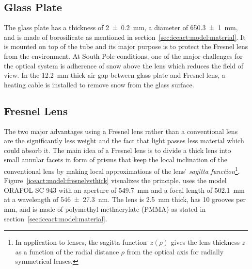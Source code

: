 \subsection{Glass Plate}\label{iceact:model:glassplate}

The \iceact glass plate has a thickness of \SI{2+-0.2}{\milli\meter}, a diameter of \SI{650.3+-1}{\milli\meter}, and is made of borosilicate as mentioned in section~\ref{sec:iceact:model:material}. It is mounted on top of the tube and its major purpose is to protect the Fresnel lens from the environment. At South Pole conditions, one of the major challenges for the optical system is adherence of snow above the lens which reduces the field of view. In the \SI{12.2}{\milli\meter} thick air gap between glass plate and Fresnel lens, a heating cable is installed to remove snow from the glass surface. 

\subsection{Fresnel Lens}\label{iceact:model:fresnellens}

The two major advantages using a Fresnel lens rather than a conventional lens are the significantly less weight and the fact that light passes less material which could absorb it. The main idea of a Fresnel lens is to divide a thick lens into small annular facets in form of prisms that keep the local inclination of the conventional lens by making local approximations of the lens' \textit{sagitta function}\footnote{In application to lenses, the sagitta function~$z(\rho)$ gives the lens thickness $z$ as a function of the radial distance $\rho$ from the optical axis for radially symmetrical lenses.}. Figure~\ref{iceact:model:fresnelvsthick} visualizes the principle. \iceact uses the model ORAFOL SC 943 with an aperture of \SI{549.7}{\milli\meter} and a focal length of \SI{502.1}{\milli\meter} at a wavelength of \SI{546+-27.3}{\nano\meter}. The lens is \SI{2.5}{\milli\meter} thick, has 10 grooves per \si{\milli\meter}, and is made of polymethyl methacrylate (PMMA) as stated in section~\ref{sec:iceact:model:material}.~\cite{iceact:fresnellens:datasheet}\\

